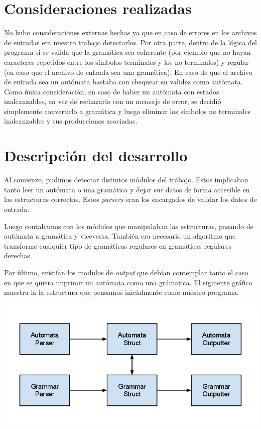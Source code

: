 \documentclass[a4paper,10pt]{article}
\begin{document}
\section{Consideraciones realizadas}
    No hubo consideraciones externas hechas ya que en caso de errores en los archivos de entradas era nuestro trabajo
     detectarlos. Por otra parte, dentro de la lógica del programa si se valida que la gramática sea coherente 
      (por ejemplo que no hayan caracteres repetidos entre los símbolos terminales y los no terminales) y regular
      (en caso que el archivo de entrada sea una gramática). En caso de que el archivo de entrada sea un autómata
      bastaba con chequear su validez como autómata. \\
Como única consideración, en caso de haber un autómata con estados inalcanzables, en vez de rechazarlo con un mensaje de error, 
se decidió simplemente convertirlo a gramática y luego eliminar los símbolos no terminales inalcanzables y sus producciones asociadas.

\newpage

\section{Descripción del desarrollo}
    Al comienzo, pudimos detectar distintos módulos del trábajo. Estos implicaban tanto leer un autómata o una gramática
     y dejar sus datos de forma accesible en las estructuras correctas. Estos \textit{parsers} eran los encargados
      de validar los datos de entrada.
      
      Luego contabamos con los módulos que manipulaban las estructuras, pasando de autómata a gramática y viceversa.
      También era necesario un algoritmo que transforme cualquier tipo de gramáticas regulares en gramáticas 
       regulares derechas.

      Por último, existían los modulos de \textit{output} que debían contemplar tanto el caso en que se quiera imprimir
       un autómata como una grámatica.
      El siguiente gráfico muestra la la estructura que pensamos inicialmente como nuestro programa.

      \begin{center}
      \includegraphics[scale=0.5]{./images/ATL-SegundoDiagrama.png}
      \end{center}
\end{document}
